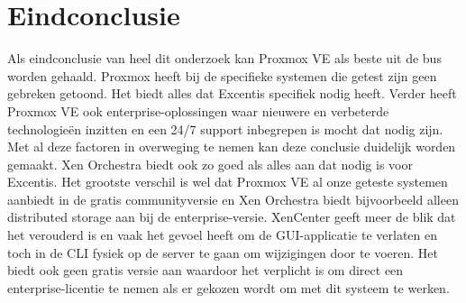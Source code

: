 \section{Eindconclusie}
Als eindconclusie van heel dit onderzoek kan Proxmox VE als beste uit de bus worden gehaald. Proxmox heeft bij de specifieke systemen die getest zijn geen gebreken getoond. Het biedt alles dat Excentis specifiek nodig heeft.
Verder heeft Proxmox VE ook enterprise-oplossingen waar nieuwere en verbeterde technologieën inzitten en een 24/7 support inbegrepen is mocht dat nodig zijn. Met al deze factoren in overweging te nemen kan deze conclusie duidelijk worden gemaakt.
Xen Orchestra biedt ook zo goed als alles aan dat nodig is voor Excentis. Het grootste verschil is wel dat Proxmox VE al onze geteste systemen aanbiedt in de gratis communityversie en Xen Orchestra biedt bijvoorbeeld alleen distributed storage aan bij de enterprise-versie.
XenCenter geeft meer de blik dat het verouderd is en vaak het gevoel heeft om de GUI-applicatie te verlaten en toch in de CLI fysiek op de server te gaan om wijzigingen door te voeren. Het biedt ook geen gratis versie aan waardoor het verplicht is om direct een enterprise-licentie te nemen als er gekozen wordt om met dit systeem te werken.